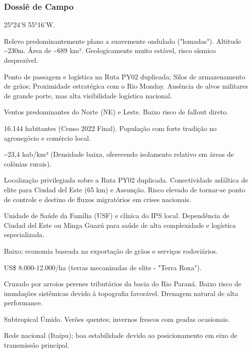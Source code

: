 \subsubsection{Dossiê de Campo}
\begin{description}[style=nextline,leftmargin=0.5cm,font=\bfseries]
\item[Coordenadas]  25°24'S 55°16'W.
\item[Topografia]  Relevo predominantemente plano a suavemente ondulado ("lomadas"). Altitude \textasciitilde 230m. Área de \textasciitilde 689 km². Geologicamente muito estável, risco sísmico desprezível.
\item[Alvos Estratégicos]  Ponto de passagem e logística na Ruta PY02 duplicada; Silos de armazenamento de grãos; Proximidade estratégica com o Rio Monday. Ausência de alvos militares de grande porte, mas alta visibilidade logística nacional.
\item[Fallout]  Ventos predominantes do Norte (NE) e Leste. Baixo risco de fallout direto.
\item[População]  16.144 habitantes (Censo 2022 Final). População com forte tradição no agronegócio e comércio local.
\item[Densidade]  \textasciitilde 23,4 hab/\allowbreak km² (Densidade baixa, oferecendo isolamento relativo em áreas de colônias rurais).
\item[Vias de Acesso]  Localização privilegiada sobre a Ruta PY02 duplicada. Conectividade asfáltica de elite para Ciudad del Este (65 km) e Assunção. Risco elevado de tornar-se ponto de controle e destino de fluxos migratórios em crises nacionais.
\item[Serviços]  Unidade de Saúde da Família (USF) e clínica do IPS local. Dependência de Ciudad del Este ou Minga Guazú para saúde de alta complexidade e logística especializada.
\item[Custo de Vida]  Baixo; economia baseada na exportação de grãos e serviços rodoviários.
\item[Preço da Terra]  US\$ 8.000-12.000/\allowbreak ha (terras mecanizadas de elite - "Terra Roxa").
\item[Hidrologia]  Cruzado por arroios perenes tributários da bacia do Rio Paraná. Baixo risco de inundações sistêmicas devido à topografia favorável. Drenagem natural de alta performance.
\item[Clima]  Subtropical Úmido. Verões quentes; invernos frescos com geadas ocasionais.
\item[Energia]  Rede nacional (Itaipu); boa estabilidade devido ao posicionamento em eixo de transmissão principal.

\end{description}
